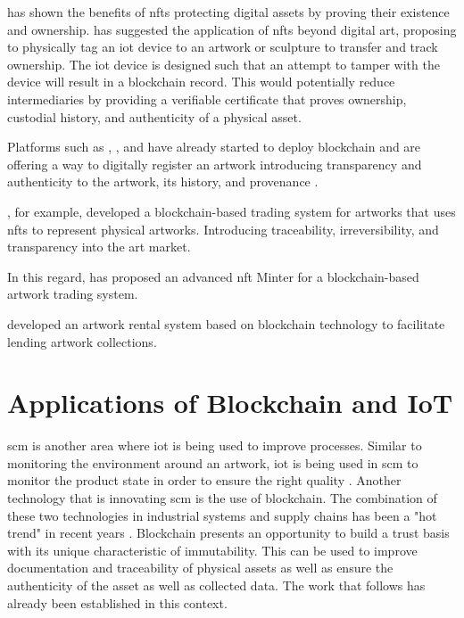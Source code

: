 \textcite{nftopportunities} has shown the benefits of \glspl{nft} protecting digital assets by proving their existence and ownership. \textcite{creativeindustry} has suggested the application of \glspl{nft} beyond digital art, proposing to physically tag an \gls{iot} device to an artwork or sculpture to transfer and track ownership. The \gls{iot} device is designed such that an attempt to tamper with the device will result in a blockchain record. This would potentially reduce intermediaries by providing a verifiable certificate that proves ownership, custodial history, and authenticity of a physical asset.

Platforms such as \textcite{artory}, \textcite{4art}, and \textcite{verisart} have already started to deploy blockchain and are offering a way to digitally register an artwork introducing transparency and authenticity to the artwork, its history, and provenance \cite{bcartmarket}.


\textcite{artchain}, for example, developed a blockchain-based trading system for artworks that uses \glspl{nft} to represent physical artworks. Introducing traceability, irreversibility, and transparency into the art market. 

In this regard, \textcite{nftminter} has proposed an advanced \gls{nft} Minter for a blockchain-based artwork trading system. 

\textcite{artrentalblockchain} developed an artwork rental system based on blockchain technology to facilitate lending artwork collections.

\section{Applications of Blockchain and IoT}
\gls{scm} is another area where \gls{iot} is being used to improve processes. Similar to monitoring the environment around an artwork, \gls{iot} is being used in \gls{scm} to monitor the product state in order to ensure the right quality \cite{iotsupplychains}. Another technology that is innovating \gls{scm} is the use of blockchain. The combination of these two technologies in industrial systems and supply chains has been a "hot trend" in recent years \cite{industryiot}. Blockchain presents an opportunity to build a trust basis with its unique characteristic of immutability. This can be used to improve documentation and traceability of physical assets as well as ensure the authenticity of the asset as well as collected data. The work that follows has already been established in this context.

